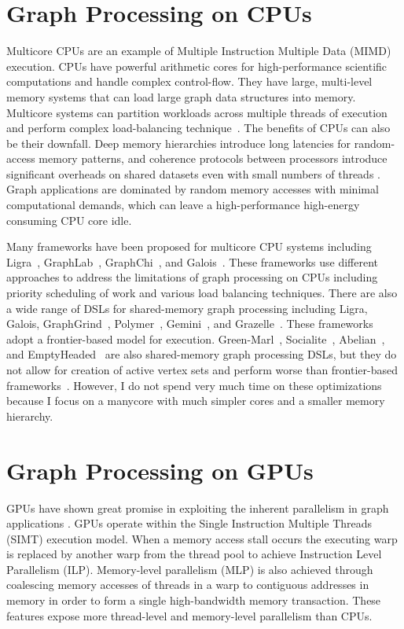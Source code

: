 \section{Graph Processing on CPUs} 
Multicore CPUs are an example of Multiple Instruction Multiple Data (MIMD) execution.
CPUs have powerful arithmetic cores for high-performance scientific computations and handle complex control-flow. 
They have large, multi-level memory systems that can load large graph data structures into memory. 
Multicore systems can partition workloads across multiple threads of execution and perform complex load-balancing technique~\cite{myers2012we}.
The benefits of CPUs can also be their downfall. Deep memory hierarchies introduce long latencies for random-access memory patterns, and coherence protocols between processors introduce significant overheads on shared datasets even with small numbers of threads \cite{lumsdaine2007challenges}.
Graph applications are dominated by random memory accesses with minimal computational demands, which can leave a high-performance high-energy consuming CPU core idle.

Many frameworks have been proposed for multicore CPU systems including Ligra~\cite{shun2013ligra}, GraphLab~\cite{low2010graphlab}, GraphChi~\cite{aapo2012graphchi}, and Galois~\cite{nguyen2013lightweight}.
These frameworks use different approaches to address the limitations of graph processing on CPUs including priority scheduling of work and various load balancing techniques.
There are also a wide range of DSLs for shared-memory graph processing including Ligra, Galois, GraphGrind~\cite{sun2017graphgrind}, Polymer~\cite{zhang2015numa}, Gemini~\cite{zhu2016gemini}, and Grazelle~\cite{grossman2018making}. 
These frameworks adopt a frontier-based model for execution.
Green-Marl~\cite{hong2012green}, Socialite~\cite{seo2013socialite}, Abelian~\cite{gill2018abelian}, and EmptyHeaded~\cite{aberger2017emptyheaded} are also shared-memory graph processing DSLs, but they do not allow for creation of active vertex sets and perform worse than frontier-based frameworks~\cite{aberger2017emptyheaded,satish2014navigating}.
However, I do not spend very much time on these optimizations because I focus on a manycore with much simpler cores and a smaller memory hierarchy.

\section{Graph Processing on GPUs} GPUs have shown great promise in exploiting the inherent parallelism in graph applications \cite{liu2016ibfs, mclaughlin2014bcongpus}.
GPUs operate within the Single Instruction Multiple Threads (SIMT) execution model.
When a memory access stall occurs the executing warp is replaced by another warp from the thread pool to achieve Instruction Level Parallelism (ILP).
Memory-level parallelism (MLP) is also achieved through coalescing memory accesses of threads in a warp to contiguous addresses in memory in order to form a single high-bandwidth memory transaction.
These features expose more thread-level and memory-level parallelism than CPUs. 

